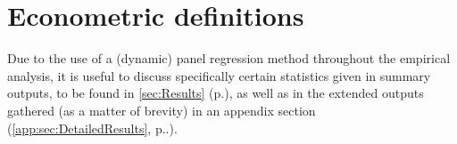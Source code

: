 \section{Econometric definitions}
\label{app:sec:EconometricDefinitions}
Due to the use of a (dynamic) panel regression method throughout the empirical analysis, it is useful to discuss specifically certain statistics given in summary outputs, to be found in \autoref{sec:Results} (p.\pageref{sec:Results}), as well as in the extended outputs gathered (as a matter of brevity) in an appendix section (\autoref{app:sec:DetailedResults}, p.\pageref{app:sec:DetailedResults}.).
